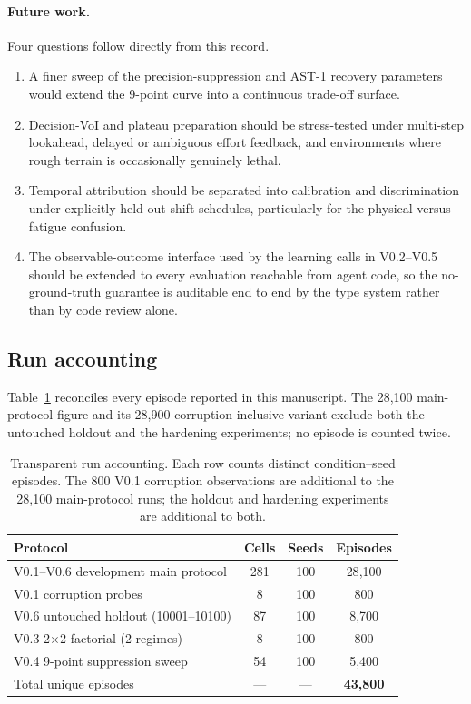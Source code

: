 \documentclass[11pt,a4paper]{article}
\begin{document}
\paragraph{Future work.}
Four questions follow directly from this record.
\begin{enumerate}
  \item A finer sweep of the precision-suppression and AST-1 recovery parameters would extend the 9-point curve into a continuous trade-off surface.
  \item Decision-VoI and plateau preparation should be stress-tested under multi-step lookahead, delayed or ambiguous effort feedback, and environments where rough terrain is occasionally genuinely lethal.
  \item Temporal attribution should be separated into calibration and discrimination under explicitly held-out shift schedules, particularly for the physical-versus-fatigue confusion.
  \item The observable-outcome interface used by the learning calls in V0.2--V0.5 should be extended to every evaluation reachable from agent code, so the no-ground-truth guarantee is auditable end to end by the type system rather than by code review alone.
\end{enumerate}

\subsection{Run accounting}

Table~\ref{tab:runs} reconciles every episode reported in this manuscript. The 28{,}100 main-protocol
figure and its 28{,}900 corruption-inclusive variant exclude both the untouched holdout and the
hardening experiments; no episode is counted twice.

\begin{table}[t]
\centering
\small
\caption{Transparent run accounting. Each row counts distinct condition--seed episodes. The 800 V0.1
corruption observations are additional to the 28{,}100 main-protocol runs; the holdout and hardening
experiments are additional to both.}
\label{tab:runs}
\begin{tabular}{lccc}
\toprule
Protocol & Cells & Seeds & Episodes \\
\midrule
V0.1--V0.6 development main protocol & 281 & 100 & 28{,}100 \\
V0.1 corruption probes & 8 & 100 & 800 \\
V0.6 untouched holdout (10001--10100) & 87 & 100 & 8{,}700 \\
V0.3 2$\times$2 factorial (2 regimes) & 8 & 100 & 800 \\
V0.4 9-point suppression sweep & 54 & 100 & 5{,}400 \\
\midrule
Total unique episodes & --- & --- & \textbf{43{,}800} \\
\bottomrule
\end{tabular}
\end{table}
\end{document}
